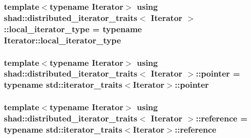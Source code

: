 \hypertarget{structshad_1_1distributed__iterator__traits_afc228b2fcc17374bae1db42f3f666ac8}{
\subsubsection[{local\-\_\-iterator\-\_\-type}]{\setlength{\rightskip}{0pt plus 5cm}template$<$typename Iterator$>$ using {\bf shad\-::distributed\-\_\-iterator\-\_\-traits}$<$ Iterator $>$\-::{\bf local\-\_\-iterator\-\_\-type} =  typename Iterator\-::local\-\_\-iterator\-\_\-type}}\label{structshad_1_1distributed__iterator__traits_afc228b2fcc17374bae1db42f3f666ac8}
\hypertarget{structshad_1_1distributed__iterator__traits_a3a4ebe1206d3e4d866752f2a3080f699}{
\subsubsection[{pointer}]{\setlength{\rightskip}{0pt plus 5cm}template$<$typename Iterator$>$ using {\bf shad\-::distributed\-\_\-iterator\-\_\-traits}$<$ Iterator $>$\-::{\bf pointer} =  typename std\-::iterator\-\_\-traits$<$Iterator$>$\-::{\bf pointer}}}\label{structshad_1_1distributed__iterator__traits_a3a4ebe1206d3e4d866752f2a3080f699}
\hypertarget{structshad_1_1distributed__iterator__traits_a82276f0370374d079f192c503f21b7a5}{
\subsubsection[{reference}]{\setlength{\rightskip}{0pt plus 5cm}template$<$typename Iterator$>$ using {\bf shad\-::distributed\-\_\-iterator\-\_\-traits}$<$ Iterator $>$\-::{\bf reference} =  typename std\-::iterator\-\_\-traits$<$Iterator$>$\-::{\bf reference}}}\label{structshad_1_1distributed__iterator__traits_a82276f0370374d079f192c503f21b7a5}
